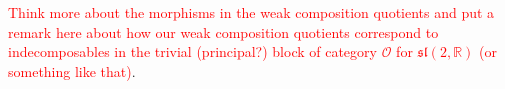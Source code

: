 \noindent\textcolor{red}{Think more about the morphisms in the weak composition quotients and put a remark here about how our weak composition quotients correspond to indecomposables in the trivial (principal?) block of category $\mathcal{O}$ for $\mathfrak{sl}(2, \mathbb{R})$ (or something like that)}.\\


